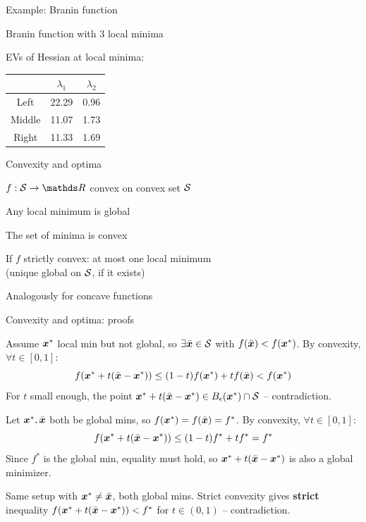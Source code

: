 \documentclass[11pt,compress,t,notes=noshow, xcolor=table]{beamer}
\begin{document}
\begin{framei}{Example: Branin function}
\item Branin function with 3 local minima
\item EVs of Hessian at local minima:
\begin{center}
\begin{tabular}{c|c|c}
        & $\lambda_1$ & $\lambda_2$ \\ \hline\hline
Left    & 22.29       & 0.96        \\ \hline
Middle  & 11.07       & 1.73        \\ \hline
Right   & 11.33       & 1.69        \\
\end{tabular}
\end{center}
\end{framei}

\begin{framei}{Convexity and optima}
\item $f: \S \to \R$ convex on convex set $\S$
\item Any local minimum is global
\item The set of minima is convex
\item If $f$ strictly convex: at most one local minimum\\
(unique global on $\S$, if it exists)
\item Analogously for concave functions
\end{framei}


\begin{framei}[fs=footnotesize]{Convexity and optima: proofs}
\item[\textbf{Local = global.}] Assume $\xvs$ local min but not global, so $\exists \bar{\xv} \in \S$ with $f(\bar{\xv}) < f(\xvs)$. By convexity, $\forall t \in [0,1]$:
$$
f(\xvs + t(\bar{\xv} - \xvs)) \leq (1-t) f(\xvs) + t f(\bar{\xv}) < f(\xvs)
$$
For $t$ small enough, the point $\xvs + t(\bar{\xv} - \xvs) \in B_\eps(\xvs) \cap \S$ -- contradiction.
\spacer
\item[\textbf{Set of minima convex.}] Let $\xvs, \bar{\xv}$ both be global mins, so $f(\xvs) = f(\bar{\xv}) = f^\ast$. By convexity, $\forall t \in [0,1]$:
$$
f(\xvs + t(\bar{\xv} - \xvs)) \leq (1-t) f^\ast + t f^\ast = f^\ast
$$
Since $f^\ast$ is the global min, equality must hold, so $\xvs + t(\bar{\xv} - \xvs)$ is also a global minimizer.
\spacer
\item[\textbf{Strict convex $\Rightarrow$ at most one min.}] Same setup with $\xvs \neq \bar{\xv}$, both global mins. Strict convexity gives \textbf{strict} inequality $f(\xvs + t(\bar{\xv} - \xvs)) < f^\ast$ for $t \in (0,1)$ -- contradiction.
\end{framei}
\end{document}
